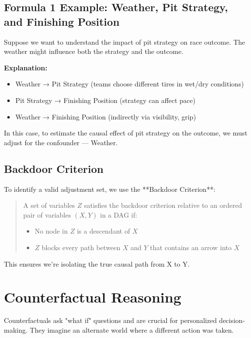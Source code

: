 \documentclass[12pt]{book}
\begin{document}
\subsection*{Formula 1 Example: Weather, Pit Strategy, and Finishing Position}

Suppose we want to understand the impact of pit strategy on race outcome. The weather might influence both the strategy and the outcome.



\textbf{Explanation:}
\begin{itemize}
    \item Weather → Pit Strategy (teams choose different tires in wet/dry conditions)
    \item Pit Strategy → Finishing Position (strategy can affect pace)
    \item Weather → Finishing Position (indirectly via visibility, grip)
\end{itemize}

In this case, to estimate the causal effect of pit strategy on the outcome, we must adjust for the confounder — Weather.

\subsection*{Backdoor Criterion}

To identify a valid adjustment set, we use the **Backdoor Criterion**:
\begin{quote}
A set of variables \( Z \) satisfies the backdoor criterion relative to an ordered pair of variables \( (X, Y) \) in a DAG if:
\begin{itemize}
    \item No node in \( Z \) is a descendant of \( X \)
    \item \( Z \) blocks every path between \( X \) and \( Y \) that contains an arrow into \( X \)
\end{itemize}
\end{quote}

This ensures we're isolating the true causal path from X to Y.

\section{Counterfactual Reasoning}

Counterfactuals ask "what if" questions and are crucial for personalized decision-making. They imagine an alternate world where a different action was taken.
\end{document}
